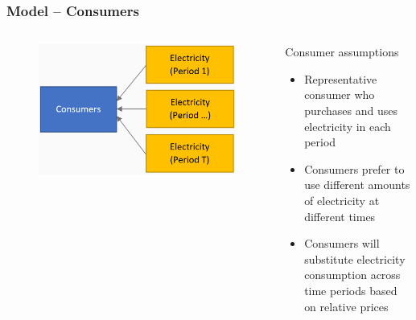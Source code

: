 \documentclass[aspectratio=169]{beamer}
\begin{document}
	
	
	
	\begin{frame}
		\frametitle{Model -- Consumers}
		
		
		
		\begin{columns}[T]%
			
			\begin{figure}
				\includegraphics[width=1\textwidth]{../figures/model_diagram_cons.png} 
			\end{figure}
			
			\begin{block}{Consumer assumptions}
				\begin{itemize}
					\setlength\itemsep{0.25em}
					\item Representative consumer who purchases and uses electricity in each period
					\item Consumers prefer to use different amounts of electricity at different times
					\item Consumers will substitute electricity consumption across time periods based on relative prices%
				\end{itemize}
			\end{block}
			
		\end{columns}
		
		
	\end{frame}
	
\end{document}
